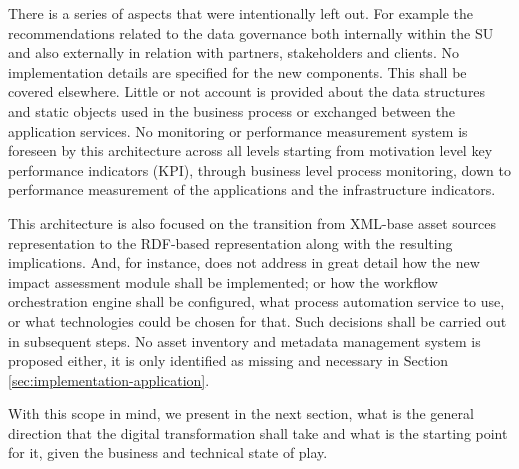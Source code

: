	There is a series of aspects that were intentionally left out. For example the recommendations related to the data governance both internally within the SU and also externally in relation with partners, stakeholders and clients. No implementation details are specified for the new components. This shall be covered elsewhere. Little or not account is provided about the data structures and static objects used in the business process or exchanged between the application services. No monitoring or performance measurement system is foreseen by this architecture across all levels starting from motivation level key performance indicators (KPI), through business level process monitoring, down to performance measurement of the applications and the infrastructure indicators. 
	
	This architecture is also focused on the transition from XML-base asset sources representation to the RDF-based representation along with the resulting implications. And, for instance, does not address in great detail how the new impact assessment module shall be implemented; or how the workflow orchestration engine shall be configured, what process automation service to use, or what technologies could be chosen for that. Such decisions shall be carried out in subsequent steps.	No asset inventory and metadata management system is proposed either, it is only identified as missing and necessary in Section \ref{sec:implementation-application}. 
	
	With this scope in mind, we present in the next section, what is the general direction that the digital transformation shall take and what is the starting point for it, given the business and technical state of play. 